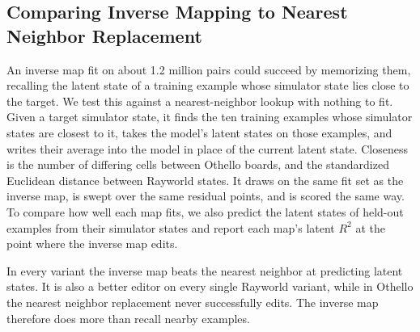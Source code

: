 \documentclass{article} %
\begin{document}
\FloatBarrier
\subsection{Comparing Inverse Mapping to Nearest Neighbor Replacement}
\label{app:inverse_nearest_neighbor}

An inverse map fit on about 1.2 million pairs could succeed by memorizing them, recalling the latent state of a training example whose simulator state lies close to the target. We test this against a nearest-neighbor lookup with nothing to fit. Given a target simulator state, it finds the ten training examples whose simulator states are closest to it, takes the model's latent states on those examples, and writes their average into the model in place of the current latent state. Closeness is the number of differing cells between Othello boards, and the standardized Euclidean distance between Rayworld states. It draws on the same fit set as the inverse map, is swept over the same residual points, and is scored the same way. To compare how well each map fits, we also predict the latent states of held-out examples from their simulator states and report each map's latent $R^2$ at the point where the inverse map edits.

In every variant the inverse map beats the nearest neighbor at predicting latent states. It is also a better editor on every single Rayworld variant, while in Othello the nearest neighbor replacement never successfully edits. The inverse map therefore does more than recall nearby examples.
\end{document}
